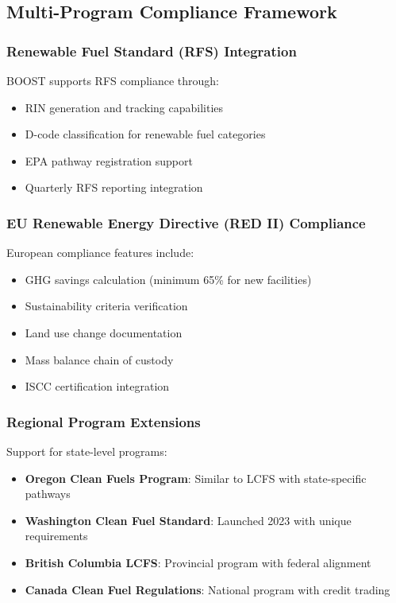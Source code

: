 \subsection{Multi-Program Compliance Framework}
\label{sec:multi-program}

\subsubsection{Renewable Fuel Standard (RFS) Integration}

BOOST supports RFS compliance through:

\begin{itemize}
    \item RIN generation and tracking capabilities
    \item D-code classification for renewable fuel categories
    \item EPA pathway registration support
    \item Quarterly RFS reporting integration
\end{itemize}

\subsubsection{EU Renewable Energy Directive (RED II) Compliance}

European compliance features include:

\begin{itemize}
    \item GHG savings calculation (minimum 65\% for new facilities)
    \item Sustainability criteria verification
    \item Land use change documentation
    \item Mass balance chain of custody
    \item ISCC certification integration
\end{itemize}

\subsubsection{Regional Program Extensions}

Support for state-level programs:

\begin{itemize}
    \item \textbf{Oregon Clean Fuels Program}: Similar to LCFS with state-specific pathways
    \item \textbf{Washington Clean Fuel Standard}: Launched 2023 with unique requirements
    \item \textbf{British Columbia LCFS}: Provincial program with federal alignment
    \item \textbf{Canada Clean Fuel Regulations}: National program with credit trading
\end{itemize}

